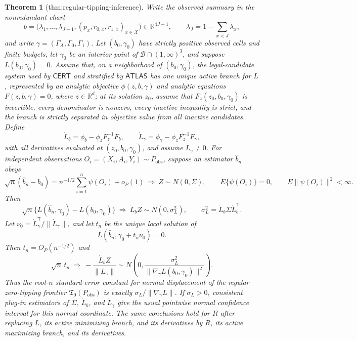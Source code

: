 \documentclass{article}
\newtheorem{theorem}{Theorem}
\begin{document}
\begin{theorem}[thm:regular-tipping-inference]\label{thm:regular-tipping-inference}
Write the observed summary in the nonredundant chart
\[
b=\bigl(\lambda_1,\ldots,\lambda_{J-1},(p_x,r_{0,x},r_{1,x})_{x\in\mathcal X}\bigr)\in\mathbb R^{4J-1},
\qquad
\lambda_J=1-\sum_{x<J}\lambda_x,
\]
and write \(\gamma=(\Gamma_A,\Gamma_0,\Gamma_1)\).  Let \((b_0,\gamma_0)\) have strictly positive observed cells and finite budgets, let \(\gamma_0\) be an interior point of \(\mathcal B\cap(1,\infty)^3\), and suppose \(L(b_0,\gamma_0)=0\).  Assume that, on a neighborhood of \((b_0,\gamma_0)\), the legal-candidate system used by \(\mathsf{CERT}\) and stratified by \(\mathsf{ATLAS}\) has one unique active branch for \(L\), represented by an analytic objective \(\phi(z,b,\gamma)\) and analytic equations \(F(z,b,\gamma)=0\), where \(z\in\mathbb R^d\); at its solution \(z_0\), assume that \(F_z(z_0,b_0,\gamma_0)\) is invertible, every denominator is nonzero, every inactive inequality is strict, and the branch is strictly separated in objective value from all inactive candidates.  Define
\[
\dot L_b=\phi_b-\phi_zF_z^{-1}F_b,
\qquad
\dot L_\gamma=\phi_\gamma-\phi_zF_z^{-1}F_\gamma,
\]
with all derivatives evaluated at \((z_0,b_0,\gamma_0)\), and assume \(\dot L_\gamma\neq0\).  For independent observations \(O_i=(X_i,A_i,Y_i)\sim P_{\mathrm{obs}}\), suppose an estimator \(\widehat b_n\) obeys
\[
\sqrt n(\widehat b_n-b_0)
=n^{-1/2}\sum_{i=1}^n\psi(O_i)+o_P(1)
\ \Longrightarrow\ Z\sim N(0,\Sigma),
\qquad
E\{\psi(O_i)\}=0,
\qquad
E\|\psi(O_i)\|^2<\infty.
\]
Then
\[
\sqrt n\{L(\widehat b_n,\gamma_0)-L(b_0,\gamma_0)\}
\ \Longrightarrow\ \dot L_bZ
\sim N(0,\sigma_L^2),
\qquad
\sigma_L^2=\dot L_b\Sigma\dot L_b^{\mathsf T}.
\]
Let \(\nu_0=\dot L_\gamma^{\mathsf T}/\|\dot L_\gamma\|\), and let \(t_n\) be the unique local solution of
\[
L(\widehat b_n,\gamma_0+t_n\nu_0)=0.
\]
Then \(t_n=O_P(n^{-1/2})\) and
\[
\sqrt n\,t_n
\ \Longrightarrow\
-\frac{\dot L_bZ}{\|\dot L_\gamma\|}
\sim N\!\left(0,\frac{\sigma_L^2}{\|\nabla_\gamma L(b_0,\gamma_0)\|^2}\right).
\]
Thus the root-\(n\) standard-error constant for normal displacement of the regular zero-tipping frontier \(\mathfrak T_0(P_{\mathrm{obs}})\) is exactly \(\sigma_L/\|\nabla_\gamma L\|\).  If \(\sigma_L>0\), consistent plug-in estimators of \(\Sigma\), \(\dot L_b\), and \(\dot L_\gamma\) give the usual pointwise normal confidence interval for this normal coordinate.  The same conclusions hold for \(R\) after replacing \(L\), its active minimizing branch, and its derivatives by \(R\), its active maximizing branch, and its derivatives.
\end{theorem}
\end{document}
